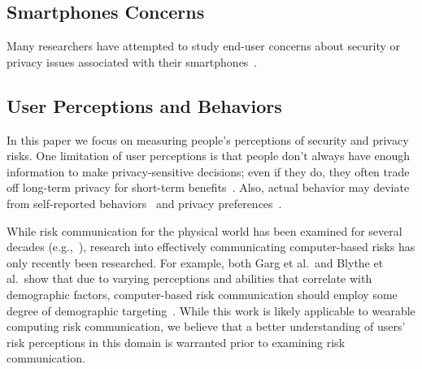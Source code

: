 \subsection{Smartphones Concerns}
Many researchers have attempted to study end-user concerns about security or privacy issues associated with their smartphones~\cite{chin2012measuring, palen2000going, felt2012android}.  


\subsection{User Perceptions and Behaviors}
In this paper we focus on measuring people's perceptions of security and privacy risks. One limitation of user perceptions is that people don't always have enough information to make privacy-sensitive decisions; even if they do, they often trade off long-term privacy for short-term benefits~\cite{acquisti2005privacy}. Also, actual behavior may deviate from self-reported behaviors~\cite{jensen2005privacy} and privacy preferences~\cite{spiekermann2001privacy}.

While risk communication for the physical world has been examined for several decades (e.g.,~\cite{Fischhoff,Morgan2001}), research into effectively communicating computer-based risks has only recently been researched. For example, both Garg et al.\ and Blythe et al.\ show that due to varying perceptions and abilities that correlate with demographic factors, computer-based risk communication should employ some degree of demographic targeting~\cite{Garg2012,Blythe2011}. While this work is likely applicable to wearable computing risk communication, we believe that a better understanding of users' risk perceptions in this domain is warranted prior to examining risk communication.